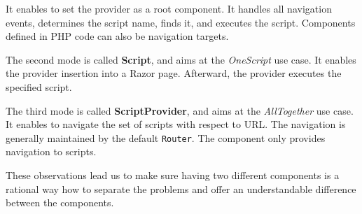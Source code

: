 It enables to set the provider as a root component.
It handles all navigation events, determines the script name, finds it, and executes the script.
Components defined in PHP code can also be navigation targets.
\par
The second mode is called \textbf{Script}, and aims at the \textit{OneScript} use case.
It enables the provider insertion into a Razor page.
Afterward, the provider executes the specified script.
\par
The third mode is called \textbf{ScriptProvider}, and aims at the \textit{AllTogether} use case.
It enables to navigate the set of scripts with respect to URL.
The navigation is generally maintained by the default \texttt{Router}.
The component only provides navigation to scripts.
\par
These observations lead us to make sure having two different components is a rational way how to separate the problems and offer an understandable difference between the components.